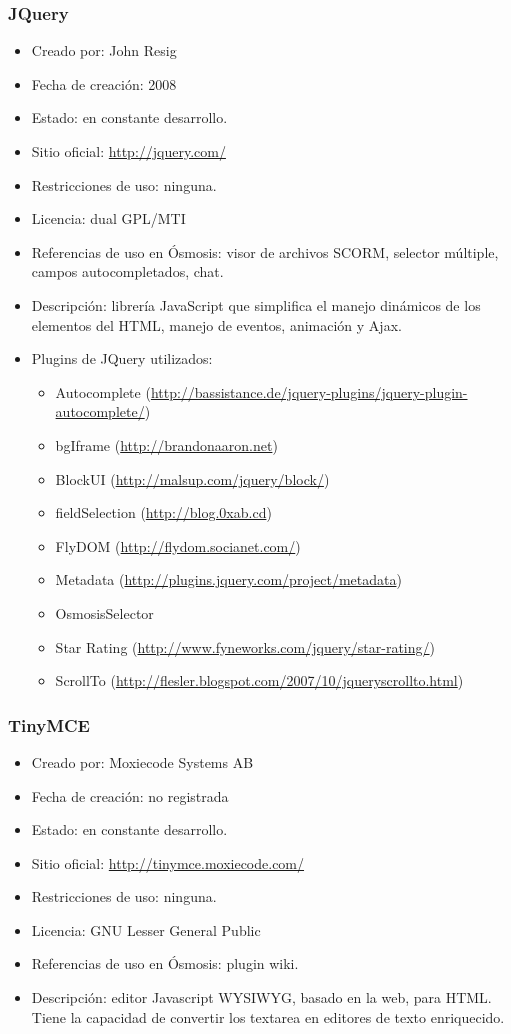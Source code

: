 \subsubsection{JQuery}
\begin{itemize}
	\item Creado por: John Resig
	\item Fecha de creación: 2008
	\item Estado: en constante desarrollo.
	\item Sitio oficial: \url{http://jquery.com/}
	\item Restricciones de uso: ninguna.
	\item Licencia: dual GPL/MTI
	\item Referencias de uso en Ósmosis: visor de archivos SCORM, selector múltiple, campos autocompletados, chat.
	\item Descripción: librería JavaScript que simplifica el manejo dinámicos de los elementos del HTML, manejo de eventos, animación y Ajax.
	\item Plugins de JQuery utilizados:
	\begin{itemize}
		\item Autocomplete (\url{http://bassistance.de/jquery-plugins/jquery-plugin-autocomplete/})
		\item bgIframe (\url{http://brandonaaron.net})
		\item BlockUI (\url{http://malsup.com/jquery/block/})
		\item fieldSelection (\url{http://blog.0xab.cd})
		\item FlyDOM (\url{http://flydom.socianet.com/})		
		\item Metadata (\url{http://plugins.jquery.com/project/metadata})
		\item OsmosisSelector
		\item Star Rating (\url{http://www.fyneworks.com/jquery/star-rating/})
		\item ScrollTo (\url{http://flesler.blogspot.com/2007/10/jqueryscrollto.html})
	\end{itemize}
\end{itemize}

\subsubsection{TinyMCE}
\begin{itemize}
	\item Creado por: Moxiecode Systems AB
	\item Fecha de creación: no registrada
	\item Estado: en constante desarrollo.
	\item Sitio oficial: \url{http://tinymce.moxiecode.com/}
	\item Restricciones de uso: ninguna.
	\item Licencia: GNU Lesser General Public
	\item Referencias de uso en Ósmosis: plugin wiki.
	\item Descripción: editor Javascript WYSIWYG, basado en la web, para HTML. Tiene la capacidad de convertir los textarea en editores de texto enriquecido.
\end{itemize}

